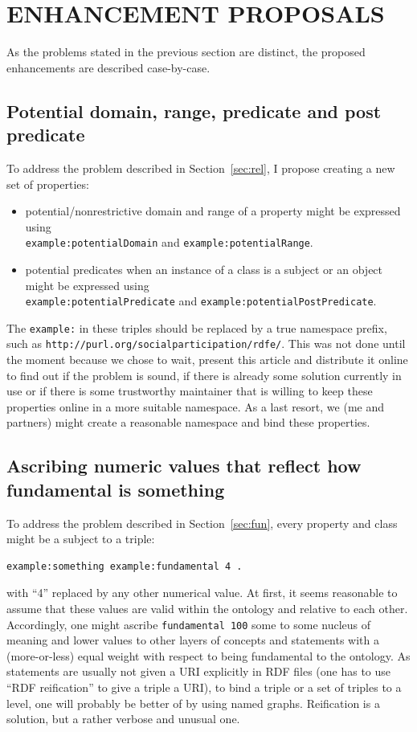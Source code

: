 \documentclass[12pt,fleqn]{article}
\begin{document}
\section{ENHANCEMENT PROPOSALS}\label{sec:prop}
As the problems stated in the previous section are distinct,
the proposed enhancements are described case-by-case.

\subsection{Potential domain, range, predicate and post predicate}\label{pot}
To address the problem described in Section~\ref{sec:rel},
I propose creating a new set of properties:
\begin{itemize}
	\item potential/nonrestrictive domain and range of a property might be expressed using\\
		\texttt{example:potentialDomain} and \texttt{example:potentialRange}.
	\item potential predicates when an instance of a class is a subject or an object might
		be expressed using\\
		\texttt{example:potentialPredicate} and \texttt{example:potentialPostPredicate}.
\end{itemize}

The \texttt{example:} in these triples should be replaced by a true namespace prefix, such
as \texttt{http://purl.org/socialparticipation/rdfe/}.
This was not done until the moment because we chose to wait,
present this article and distribute it online to find out if the problem is sound, if there is already some
solution currently in use or if there is some trustworthy maintainer that is willing
to keep these properties online in a more suitable namespace.
As a last resort, we (me and partners) might create a reasonable namespace
and bind these properties.

\subsection{Ascribing numeric values that reflect how fundamental is something}\label{sec:props}
To address the problem described in Section~\ref{sec:fun},
every property and class might be a subject to a triple:
\begin{Verbatim}[fontsize=\footnotesize]
	example:something example:fundamental 4 .
\end{Verbatim}
\noindent with ``4'' replaced by any other numerical value.
At first, it seems reasonable to assume that these values are
valid within the ontology and relative to each other.
Accordingly, one might ascribe \texttt{fundamental 100}
some to some nucleus of meaning and lower values to other layers of
concepts and statements with a (more-or-less) equal weight with respect
to being fundamental to the ontology.
As statements are usually not given a URI explicitly
in RDF files (one has to use ``RDF reification'' to give a triple a URI),
to bind a triple or a set of triples to a level,
one will probably be better of by using named graphs.
Reification is a solution, but a rather verbose and unusual one.
\end{document}
